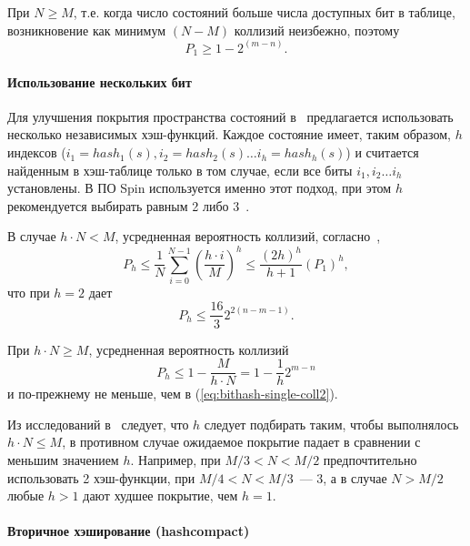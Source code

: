 При $N \geq M$, т.е. когда число состояний больше числа доступных бит в таблице,
возникновение как минимум $(N - M)$ коллизий неизбежно, поэтому
\begin{equation}
  \label{eq:bithash-single-coll2}
  P_1 \geq 1 - 2^{(m-n)}.
\end{equation}

\paragraph{Использование нескольких бит}

Для улучшения покрытия пространства состояний в~\cite{BitHash1} предлагается использовать
несколько независимых хэш-функций. Каждое состояние имеет, таким образом, $h$ индексов
($i_1 = hash_1(s), i_2 = hash_2(s) \ldots i_h = hash_h(s)$) и считается найденным в
хэш-таблице только в том случае, если все биты $i_1, i_2 \ldots i_h$ установлены. В ПО
Spin используется именно этот подход, при этом $h$ рекомендуется выбирать равным 2 либо
3~\cite{SpinRoot}.

В случае $h \cdot N < M$, усредненная вероятность коллизий, согласно~\cite{BitHash1},
\begin{equation}
  \label{eq:bithash-multi-coll1}
  P_h \leq \frac{1}{N} \sum_{i=0}^{N-1} (\frac{h \cdot i}{M})^h \leq \frac{(2 h)^h}{h+1} (P_1)^h,
\end{equation}
что при $h = 2$ дает 
\begin{equation}
  \label{eq:bithash-2bit-coll1}
  P_h \leq \frac{16}{3} 2^{2(n -m - 1)}.
\end{equation}

При $h \cdot N \geq M$, усредненная вероятность коллизий 
\begin{equation}
  \label{eq:bithash-multi-coll2}
  P_h \leq 1 - \frac{M}{h \cdot N} = 1 - \frac{1}{h} 2^{m - n}
\end{equation}
и по-прежнему не меньше, чем в (\ref{eq:bithash-single-coll2}).

Из исследований в~\cite{BitHash1} следует, что $h$ следует подбирать таким, чтобы
выполнялось $h \cdot N \leq M$, в противном случае ожидаемое покрытие падает в сравнении с
меньшим значением $h$. Например, при $M/3 < N < M/2$ предпочтительно использовать 2
хэш-функции, при $M/4 < N < M/3$~--- 3, а в случае $N > M/2$ любые $h > 1$ дают худшее
покрытие, чем $h = 1$.

\paragraph{Вторичное хэширование (hashcompact)}

